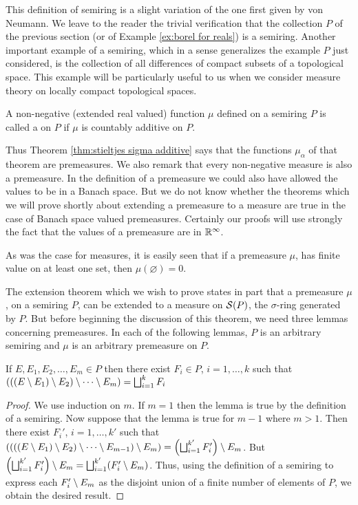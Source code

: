 This definition of semiring is a slight variation of the one first given by von Neumann. We leave to the reader the trivial verification that the collection $P$ of the previous section (or of Example \ref{ex:borel for reals}) is a semiring. Another important example of a semiring, which in a sense generalizes the example $P$ just considered, is the collection of all differences of compact subsets of a topological space. This example will be particularly useful to us when we consider measure theory on locally compact topological spaces.

\begin{definition}
A non-negative (extended real valued) function $\mu$ defined on a semiring $P$ is called a  on $P$ if $\mu$ is countably additive on $P$.
\end{definition}

Thus Theorem \ref{thm:stieltjes sigma additive} says that the functions $\mu_\alpha$ of that theorem are premeasures. We also remark that every non-negative measure is also a premeasure. In the definition of a premeasure we could also have allowed the values to be in a Banach space. But we do not know whether the theorems which we will prove shortly about extending a premeasure to a measure are true in the case of Banach space valued premeasures. Certainly our proofs will use strongly the fact that the values of a premeasure are in $\mathbb{R}^\infty$.

As was the case for measures, it is easily seen that if a premeasure $\mu$, has finite value on at least one set, then $\mu(\varnothing)=0$.

The extension theorem which we wish to prove states in part that a premeasure $\mu$, on a semiring $P$, can be extended to a measure on ${\cal S}(P)$, the $\sigma$-ring generated by $P$. But before beginning the discussion of this theorem, we need three lemmas concerning premeasures. In each of the following lemmas, $P$ is an arbitrary semiring and $\mu$ is an arbitrary premeasure on $P$.

\begin{lemma}\label{lem:repeated set diff}
If $E,E_1,E_2,\dots,E_m\in P$ then there exist $F_i\in P$, $i=1,\dots,k$ such that $(((E\setminus E_1)\setminus E_2)\setminus\cdots\setminus E_m)=\bigsqcup_{i=1}^kF_i$ 
\end{lemma}

\begin{proof}
We use induction on $m$. If $m=1$ then the lemma is true by the definition of a semiring. Now suppose that the lemma is true for $m-1$ where $m>1$. Then there exist $F_i'$, $i=1,\dots,k'$ such that $((((E\setminus E_1)\setminus E_2)\setminus\cdots\setminus E_{m-1})\setminus E_m)=\left(\bigsqcup_{i=1}^{k'}F_i'\right)\setminus E_m$. But $\left(\bigsqcup_{i=1}^{k'}F_i'\right)\setminus E_m=\bigsqcup_{i=1}^{k'}(F_i'\setminus E_m)$. Thus, using the definition of a semiring to express each $F_i'\setminus E_m$ as the disjoint union of a finite number of elements of $P$, we obtain the desired result.
\end{proof}


